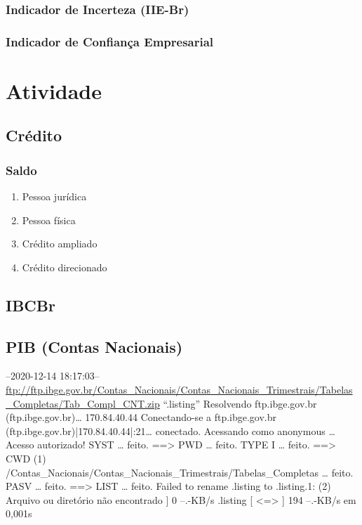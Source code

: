 \documentclass[11pt]{article}
\begin{document}
\subsubsection{Indicador de Incerteza (IIE-Br)}
\label{sec:orgd2c31b6}


\subsubsection{Indicador de Confiança Empresarial}
\label{sec:orgf0c7a11}

\section{Atividade}
\label{sec:org05d7f21}

\subsection{Crédito}
\label{sec:orge1215ec}


\subsubsection{Saldo}
\label{sec:orgc1f6e8d}

\begin{enumerate}
\item Pessoa jurídica
\label{sec:orgb5d0424}

\item Pessoa física
\label{sec:org421bbc3}

\item Crédito ampliado
\label{sec:org63f910c}

\item Crédito direcionado
\label{sec:org72c3de1}
\end{enumerate}



\subsection{IBCBr}
\label{sec:org68183a1}

\subsection{PIB (Contas Nacionais)}
\label{sec:org8c9609d}

--2020-12-14 18:17:03--  \url{ftp://ftp.ibge.gov.br/Contas\_Nacionais/Contas\_Nacionais\_Trimestrais/Tabelas\_Completas/Tab\_Compl\_CNT.zip}
“.listing”
Resolvendo ftp.ibge.gov.br (ftp.ibge.gov.br)\ldots{} 170.84.40.44
Conectando-se a ftp.ibge.gov.br (ftp.ibge.gov.br)|170.84.40.44|:21\ldots{} conectado.
Acessando como anonymous \ldots{} Acesso autorizado!
SYST \ldots{} feito.    ==> PWD \ldots{} feito.
TYPE I \ldots{} feito.  ==> CWD (1) /Contas\_Nacionais/Contas\_Nacionais\_Trimestrais/Tabelas\_Completas \ldots{} feito.
PASV \ldots{} feito.    ==> LIST \ldots{} feito.
Failed to rename .listing to .listing.1: (2) Arquivo ou diretório não encontrado
]       0  --.-KB/s               
.listing                [ <=>                ]     194  --.-KB/s    em 0,001s
\end{document}
